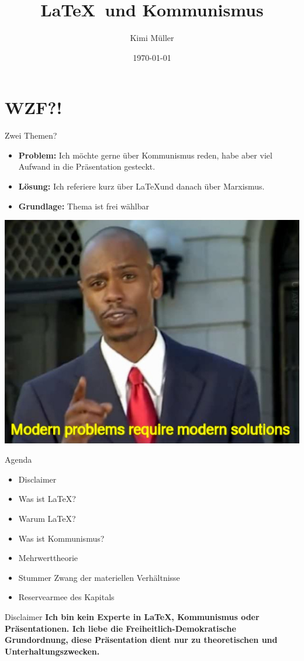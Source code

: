 \documentclass{beamer}
\title{\LaTeX \  und Kommunismus}
\date{\today}
\author{Kimi Müller}
\begin{document}
  \maketitle
  \section{WZF?!}
  \begin{frame}{Zwei Themen?}
    \begin{itemize}
        \item<1-> \textbf{Problem:} Ich möchte gerne über Kommunismus reden, habe aber viel Aufwand in die Präsentation gesteckt.
        \item<2-> \textbf{Lösung:} Ich referiere kurz über \LaTeX und danach über Marxismus.
        \item<3-> \textbf{Grundlage:} Thema ist frei wählbar
    \end{itemize}
  \end{frame}
  \begin{frame}
    \includegraphics[width=\textwidth]{Modern_Problems_Require_Modern_Solutions.jpg}
  \end{frame}
  \begin{frame}{Agenda}
\begin{itemize}
    \item<2-> Disclaimer
    \item<3-> Was ist \LaTeX?
    \item<4-> Warum \LaTeX?
    \item<5-> Was ist Kommunismus?
    \item<6-> Mehrwerttheorie
    \item<7-> Stummer Zwang der materiellen Verhältnisse
    \item<8-> Reservearmee des Kapitals
\end{itemize}
  \end{frame}
  \begin{frame}{Disclaimer}
\textbf{Ich bin kein Experte in \LaTeX, Kommunismus oder Präsentationen. Ich liebe die Freiheitlich-Demokratische Grundordnung, diese Präsentation dient nur zu theoretischen und Unterhaltungszwecken.}
\end{frame}
\end{document}
